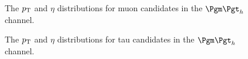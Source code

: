 \begin{figure}[htb]
\begin{center}

\end{center}
\caption{
The $p_{\mathrm{T}}$ and $\eta$ distributions for muon candidates in the $\mutau$
channel.
}
\label{fig:mutaumuons}
\end{figure}


\begin{figure}[htb]
\begin{center}

\end{center}
\caption{
The $p_{\mathrm{T}}$ and $\eta$ distributions for tau candidates in the $\mutau$
channel.
}
\label{fig:mutautaus}
\end{figure}

